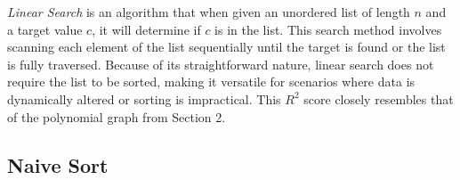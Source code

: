 \documentclass{article}
\begin{document}
        \textit{Linear Search} is an algorithm that when given an unordered list of length $n$ and a target value $c$, it will determine if $c$ is in the list. This search method involves scanning each element of the list sequentially until the target is found or the list is fully traversed. Because of its straightforward nature, linear search does not require the list to be sorted, making it versatile for scenarios where data is dynamically altered or sorting is impractical. This $R^2$ score closely resembles that of the polynomial graph from Section 2.


    \subsection{Naive Sort}

    
    
\end{document}
